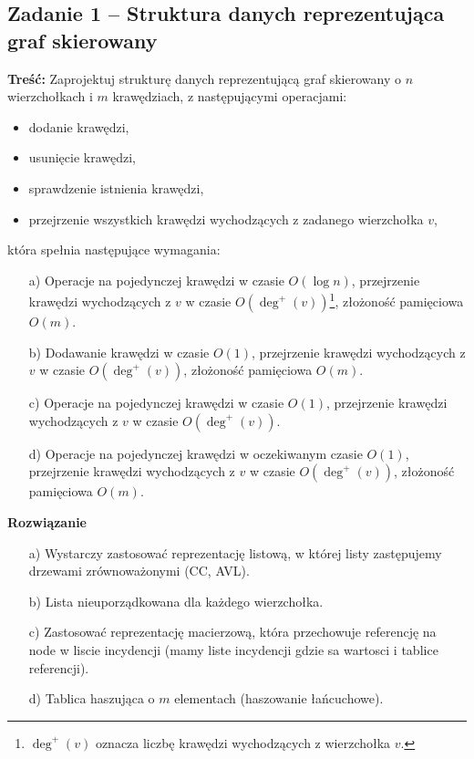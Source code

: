 \subsection{Zadanie 1 -- Struktura danych reprezentująca graf skierowany}

\textbf{Treść:} Zaprojektuj strukturę danych reprezentującą graf skierowany o $n$ wierzchołkach i $m$ krawędziach, z
następującymi operacjami:
\begin{itemize}
	\item dodanie krawędzi,
	\item usunięcie krawędzi,
	\item sprawdzenie istnienia krawędzi,
	\item przejrzenie wszystkich krawędzi wychodzących z zadanego wierzchołka $v$,
\end{itemize}
która spełnia następujące wymagania:
\begin{itemize}
	\item[a)] Operacje na pojedynczej krawędzi w czasie $O(\log n)$, przejrzenie krawędzi wychodzących z $v$ w czasie $O(\deg^+(v))$\footnote{$\deg^+(v)$ oznacza liczbę krawędzi wychodzących z wierzchołka $v$.}, 
	złożoność pamięciowa $O(m)$.
	\item[b)] Dodawanie krawędzi w czasie $O(1)$, przejrzenie krawędzi wychodzących z $v$ w czasie $O(\deg^+(v))$, złożoność
	pamięciowa $O(m)$.
	\item[c)] Operacje na pojedynczej krawędzi w czasie $O(1)$, przejrzenie krawędzi wychodzących z $v$ w czasie $O(\deg^+(v))$.
	\item[d)] Operacje na pojedynczej krawędzi w oczekiwanym czasie $O(1)$, przejrzenie krawędzi wychodzących z $v$ w czasie
	$O(\deg^+(v))$, złożoność pamięciowa $O(m)$.
\end{itemize}

\textbf{Rozwiązanie}
\begin{itemize}
	\item[a)] Wystarczy zastosować reprezentację listową, w której 
	listy zastępujemy drzewami zrównoważonymi (CC, AVL).
	\item[b)] Lista nieuporządkowana dla każdego wierzchołka.
	\item[c)] Zastosować reprezentację macierzową, która przechowuje
	referencję na node w liscie incydencji (mamy liste incydencji
	gdzie sa wartosci i tablice referencji).
	\item[d)] Tablica haszująca o $m$ elementach (haszowanie łańcuchowe).
\end{itemize}

